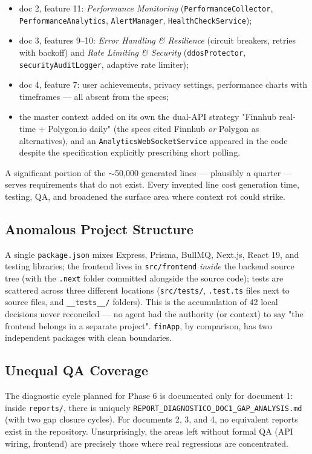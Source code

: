 \documentclass[11pt,a4paper]{article}
\newcommand{\file}[1]{\texttt{\small #1}}
\begin{document}
	\begin{itemize}[leftmargin=1.5em]
		\item doc 2, feature 11: \emph{Performance Monitoring} (\file{PerformanceCollector}, \file{PerformanceAnalytics}, \file{AlertManager}, \file{HealthCheckService});
		\item doc 3, features 9--10: \emph{Error Handling \& Resilience} (circuit breakers, retries with backoff) and \emph{Rate Limiting \& Security} (\file{ddosProtector}, \file{securityAuditLogger}, adaptive rate limiter);
		\item doc 4, feature 7: user achievements, privacy settings, performance charts with timeframes --- all absent from the specs;
		\item the master context added on its own the dual-API strategy "Finnhub real-time + Polygon.io daily" (the specs cited Finnhub \emph{or} Polygon as alternatives), and an \file{AnalyticsWebSocketService} appeared in the code despite the specification explicitly prescribing short polling.
	\end{itemize}
	
	A significant portion of the $\sim$50,000 generated lines --- plausibly a quarter --- serves requirements that do not exist. Every invented line cost generation time, testing, QA, and broadened the surface area where context rot could strike.
	
	\subsection{Anomalous Project Structure}
	
	A single \file{package.json} mixes Express, Prisma, BullMQ, Next.js, React 19, and testing libraries; the frontend lives in \file{src/frontend} \emph{inside} the backend source tree (with the \file{.next} folder committed alongside the source code); tests are scattered across three different locations (\file{src/tests/}, \file{*.test.ts} files next to source files, and \file{\_\_tests\_\_/} folders). This is the accumulation of 42 local decisions never reconciled --- no agent had the authority (or context) to say "the frontend belongs in a separate project". \file{finApp}, by comparison, has two independent packages with clean boundaries.
	
	\subsection{Unequal QA Coverage}
	
	The diagnostic cycle planned for Phase 6 is documented only for document 1: inside \file{reports/}, there is uniquely \file{REPORT\_DIAGNOSTICO\_DOC1\_GAP\_ANALYSIS.md} (with two gap closure cycles). For documents 2, 3, and 4, no equivalent reports exist in the repository. Unsurprisingly, the areas left without formal QA (API wiring, frontend) are precisely those where real regressions are concentrated.
	
\end{document}
